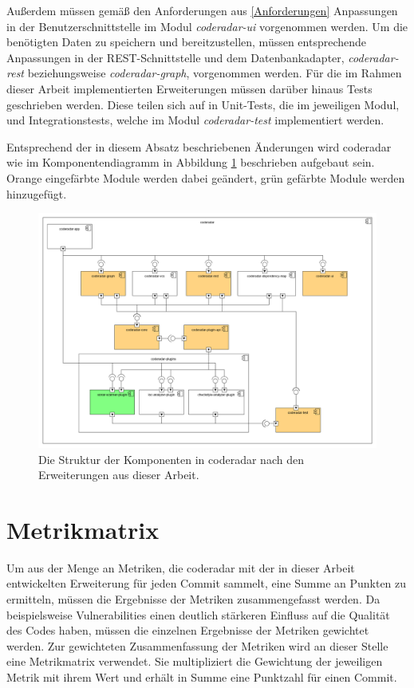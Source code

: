 \documentclass[
	oneside,  %
	ngerman, 
	final, 
	11pt, 
	a4paper, 
	1.1headlines, 
	headinclude=false, 
	footinclude=false, 
	mpinclude=false, 
	pagesize, 
	onecolumn, 
	titlepage, 
	parskip=half, 
	headsepline, 
	chapterprefix=false, 
	version=first, 
	listof=totoc, 
	bibliography=totoc, 
	toc=graduated, 
	fleqn
]{scrbook}
\begin{document}
Außerdem müssen gemäß den Anforderungen aus \ref{Anforderungen} Anpassungen in der Benutzerschnittstelle im Modul \textit{coderadar-ui} vorgenommen werden.
Um die benötigten Daten zu speichern und bereitzustellen, müssen entsprechende Anpassungen in der \acs{REST}-Schnittstelle und dem Datenbankadapter, \textit{coderadar-rest} beziehungsweise \textit{coderadar-graph}, vorgenommen werden.
Für die im Rahmen dieser Arbeit implementierten Erweiterungen müssen darüber hinaus Tests geschrieben werden.
Diese teilen sich auf in Unit-Tests, die im jeweiligen Modul, und Integrationstests, welche im Modul \textit{coderadar-test} implementiert werden.

Entsprechend der in diesem Absatz beschriebenen Änderungen wird coderadar wie im Komponentendiagramm in Abbildung \ref{component_diagram} beschrieben aufgebaut sein.
Orange eingefärbte Module werden dabei geändert, grün gefärbte Module werden hinzugefügt.

\begin{figure}[H]
	\begin{center}
		\includegraphics[width=\linewidth]{images/coderadar_components}
		\caption{Die Struktur der Komponenten in coderadar nach den Erweiterungen aus dieser Arbeit.}
		\label{component_diagram}
	\end{center}
\end{figure}

\section{Metrikmatrix}
\label{Metrikmatrix}
Um aus der Menge an Metriken, die coderadar mit der in dieser Arbeit entwickelten Erweiterung für jeden Commit sammelt, eine Summe an Punkten zu ermitteln, müssen die Ergebnisse der Metriken zusammengefasst werden.
Da beispielsweise Vulnerabilities einen deutlich stärkeren Einfluss auf die Qualität des Codes haben, müssen die einzelnen Ergebnisse der Metriken gewichtet werden.
Zur gewichteten Zusammenfassung der Metriken wird an dieser Stelle eine Metrikmatrix verwendet.
Sie multipliziert die Gewichtung der jeweiligen Metrik mit ihrem Wert und erhält in Summe eine Punktzahl für einen Commit.
\end{document}
